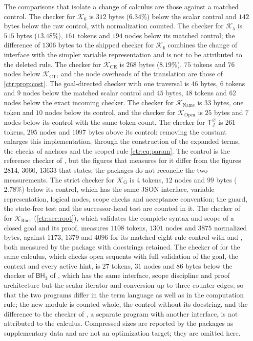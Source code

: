The comparisons that isolate a change of calculus are those against a matched control. The
checker for $\mathcal K_6$ is $312$ bytes ($6.34\%$) below the scalar control and $142$
bytes below the raw control, with normalization counted. The checker for $\mathcal K_5$ is
$515$ bytes ($13.48\%$), $161$ tokens and $194$ nodes below its matched control; the
difference of $1306$ bytes to the shipped checker for $\mathcal K_6$ combines the change of
interface with the simpler variable representation and is not to be attributed to the
deleted rule. The checker for $\mathcal K_{\mathrm{CE}}$ is $268$ bytes ($8.19\%$), $75$
tokens and $76$ nodes below $\mathcal K_{\mathrm{CT}}$, and the node overheads of the
translation are those of \cref{ctr:prop:cost}. The goal-directed checker with one traversal
is $46$ bytes, $6$ tokens and $9$ nodes below the matched scalar control and $45$ bytes,
$48$ tokens and $62$ nodes below the exact incoming checker. The checker for
$\mathcal K_{\mathrm{Name}}$ is $33$ bytes, one token and $10$ nodes below its control, and
the checker for $\mathcal K_{\mathrm{Open}}$ is $25$ bytes and $7$ nodes below its control
with the same token count. The checker for $\mathsf T_J^{\varnothing}$ is $261$ tokens, $295$
nodes and $1097$ bytes above its control: removing the constant enlarges this
implementation, through the construction of the expanded terms, the checks of anchors and
the scoped rule \eqref{ctr:eq:param}. The control is the reference checker of
, but the figures that  measures for it differ from
the figures $2814$, $3060$, $13633$ that  states; the packages do not
reconcile the two measurements. The strict checker for $\mathcal K_{\mathrm G}$ is $4$
tokens, $12$ nodes and $99$ bytes ($2.78\%$) below its control, which has the same JSON
interface, variable representation, logical nodes, scope checks and acceptance convention;
the guard, the state-free test and the successor-head test are counted in it. The checker of
 for $\mathcal K_{\mathrm{Root}}$ (\cref{ctr:sec:root}), which validates the
complete syntax and scope of a closed goal and its proof, measures $1108$ tokens, $1301$ nodes and
$3875$ normalized bytes, against $1173$, $1379$ and $4096$ for its matched eight-rule control
with  and , both measured by the package with docstrings retained.
The checker of  for the same calculus, which checks open sequents
with full validation of the goal, the context and every active hint, is $27$ tokens, $31$ nodes
and $86$ bytes below the checker of $\mathsf{BH}_3$ of , which has the same
interface, scope discipline and proof architecture but the scalar iterator and conversion up to
three counter edges, so that the two programs differ in the term language as well as in the
computation rule; the new module is counted whole, the control without its docstring, and the
difference to the checker of , a separate program with another interface,
is not attributed to the calculus. Compressed sizes are reported by the packages as supplementary
data and are not an optimization target; they are omitted here.

